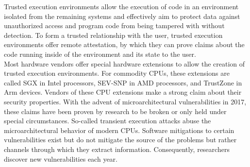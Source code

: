 


Trusted execution environments allow the execution of code in an environment
isolated from the remaining systems and effectively aim to protect data against
unauthorized access and program code from being tampered with without detection.
To form a trusted relationship with the user, trusted execution environments
offer remote attestation, by which they can prove claims about the code running
inside of the environment and its state to the user.\\

Most hardware vendors offer special hardware extensions to allow the creation of
trusted execution environments. For commodity CPUs, these extensions are called
SGX in Intel processors, SEV-SNP in AMD processors, and TrustZone in Arm
devices. Vendors of these CPU extensions make a strong claim about their
security properties. With the advent of microarchitectural vulnerabilities in
2017, these claims have been proven by research to be broken or only held under
special circumstances. So-called transient execution attacks abuse the
microarchitectural behavior of modern CPUs. Software mitigations to certain
vulnerabilities exist but do not mitigate the source of the problems but rather
channels through which they extract information. Consequently, researchers
discover new vulnerabilities each year. \\

